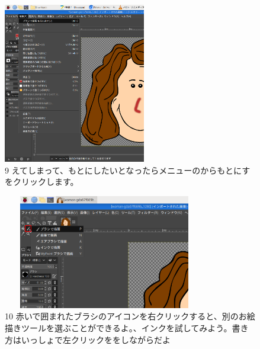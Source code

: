 \begin{figure}[ht]
  \begin{minipage}{\textwidth}
    \begin{minipage}{6.984cm}
      \includegraphics[width=6.228cm]{text01-img/textbook-img132.png}\\
      9 えてしまって、もとにしたいとなったらメニューのからもとにすをクリックします。
    \end{minipage}
    \hfill
    \begin{minipage}{8.966cm}
      \includegraphics[width=8.881cm,height=4.997cm]{text01-img/textbook-img133.png}\\
      10 赤いで囲まれたブラシのアイコンを右クリックすると、別のお絵描きツールを選ぶことができるよ。、インクを試してみよう。書き方はいっしょで左クリックををしながらだよ
    \end{minipage}
  \end{minipage}
\end{figure}
\clearpage


